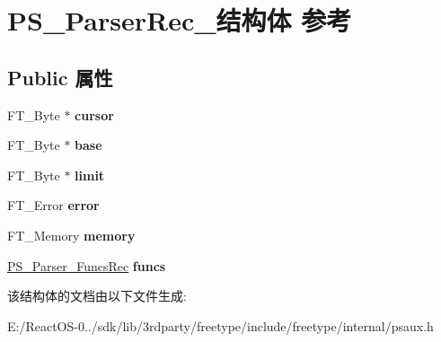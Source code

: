 \hypertarget{struct_p_s___parser_rec__}{}\section{P\+S\+\_\+\+Parser\+Rec\+\_\+结构体 参考}
\label{struct_p_s___parser_rec__}
\subsection*{Public 属性}
\begin{DoxyCompactItemize}
\item 
\mbox{\label{struct_p_s___parser_rec___a6ed189bc25c03814bdafad63819ddfe7}} 
F\+T\+\_\+\+Byte $\ast$ {\bfseries cursor}
\item 
\mbox{\label{struct_p_s___parser_rec___a30528f6a9caffce2fd44ef2d5a38e5bd}} 
F\+T\+\_\+\+Byte $\ast$ {\bfseries base}
\item 
\mbox{\label{struct_p_s___parser_rec___af3310795fd73530036fb32ec4385ea3d}} 
F\+T\+\_\+\+Byte $\ast$ {\bfseries limit}
\item 
\mbox{\label{struct_p_s___parser_rec___a7a1432cb4d8bb603663f1258224c8ec4}} 
F\+T\+\_\+\+Error {\bfseries error}
\item 
\mbox{\label{struct_p_s___parser_rec___a3e2206deb6c0d73f51c8c71d5db1db1f}} 
F\+T\+\_\+\+Memory {\bfseries memory}
\item 
\mbox{\label{struct_p_s___parser_rec___a450031fd9e77e55bf424dc64a8d2659d}} 
\hyperlink{struct_p_s___parser___funcs_rec__}{P\+S\+\_\+\+Parser\+\_\+\+Funcs\+Rec} {\bfseries funcs}
\end{DoxyCompactItemize}


该结构体的文档由以下文件生成\+:\begin{DoxyCompactItemize}
\item 
E\+:/\+React\+O\+S-\/0../sdk/lib/3rdparty/freetype/include/freetype/internal/psaux.\+h\end{DoxyCompactItemize}
